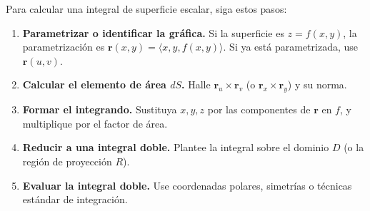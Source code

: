 \begin{pasos}
Para calcular una integral de superficie escalar, siga estos pasos:
\begin{enumerate}
\item \textbf{Parametrizar o identificar la gráfica.} Si la superficie es $z=f(x,y)$, la parametrización es $\mathbf{r}(x,y)=\langle x,y,f(x,y)\rangle$. Si ya está parametrizada, use $\mathbf{r}(u,v)$.
\item \textbf{Calcular el elemento de área $dS$.} Halle $\mathbf{r}_u \times \mathbf{r}_v$ (o $ \mathbf{r}_x \times \mathbf{r}_y$) y su norma.
\item \textbf{Formar el integrando.} Sustituya $x,y,z$ por las componentes de $\mathbf{r}$ en $f$, y multiplique por el factor de área.
\item \textbf{Reducir a una integral doble.} Plantee la integral sobre el dominio $D$ (o la región de proyección $R$).
\item \textbf{Evaluar la integral doble.} Use coordenadas polares, simetrías o técnicas estándar de integración.
\end{enumerate}
\end{pasos}

